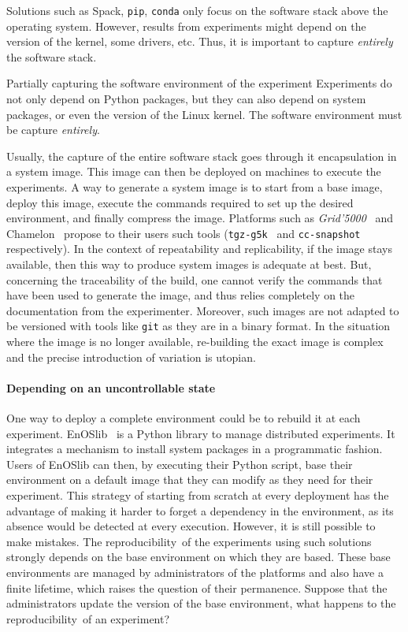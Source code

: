 \documentclass[sigconf]{acmart}
\newcommand{\repro}{reproducibility}
\newcommand{\grid}{\emph{Grid'5000}}
\begin{document}
Solutions such as Spack, \texttt{pip}, \texttt{conda} only focus on the software stack above the operating system.
However, results from experiments might depend on the version of the kernel, some drivers, etc.
Thus, it is important to capture \emph{entirely} the software stack.

\begin{trap}{Partially capturing the software environment of the experiment}{}
Experiments do not only depend on Python packages, but they can also depend on system packages, or even the version of the Linux kernel.
The software environment must be capture \emph{entirely}.
\end{trap}

Usually, the capture of the entire software stack goes through it encapsulation in a system image.
This image can then be deployed on machines to execute the experiments.
A way to generate a system image is to start from a base image, deploy this image, execute the commands required to set up the desired environment, and finally compress the image.
Platforms such as \grid\ \cite{grid5000} and Chamelon\ \cite{chameleon} propose to their users such tools (\texttt{tgz-g5k}\ \cite{tgz-g5k} and \texttt{cc-snapshot}\ \cite{cc-snapshot} respectively).
In the context of repeatability and replicability, if the image stays available, then this way to produce system images is adequate at best.
But, concerning the traceability of the build, one cannot verify the commands that have been used to generate the image, and thus relies completely on the documentation from the experimenter.
Moreover, such images are not adapted to be versioned with tools like \texttt{git} as they are in a binary format.
In the situation where the image is no longer available, re-building the exact image is complex and the precise introduction of variation is utopian.


\paragraph{Depending on an uncontrollable state}


One way to deploy a complete environment could be to rebuild it at each experiment.
EnOSlib\ \cite{cherrueau_enoslib_2022} is a Python library to manage distributed experiments.
It integrates a mechanism to install system packages in a programmatic fashion.
Users of EnOSlib can then, by executing their Python script, base their environment on a default image that they can modify as they need for their experiment.
This strategy of starting from scratch at every deployment has the advantage of making it harder to forget a dependency in the environment, as its absence would be detected at every execution.
However, it is still possible to make mistakes.
The \repro\ of the experiments using such solutions strongly depends on the base environment on which they are based.
These base environments are managed by administrators of the platforms and also have a finite lifetime, which raises the question of their permanence.  
Suppose that the administrators update the version of the base environment, what happens to the \repro\ of an experiment?
\end{document}
